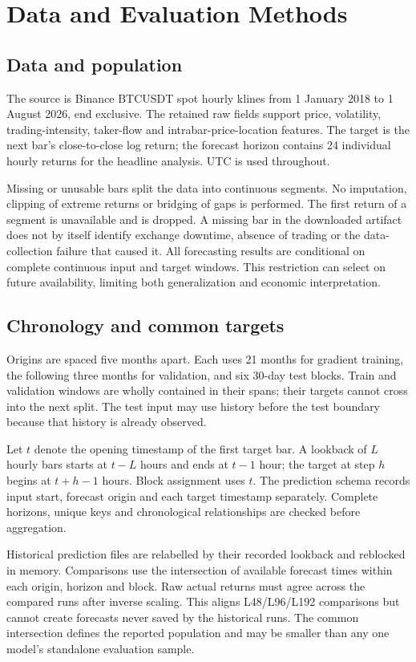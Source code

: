 \documentclass[onecolumn,journal,a4paper,11pt]{IEEEtran}
\begin{document}
\section{Data and Evaluation Methods}
\subsection{Data and population}
The source is Binance BTCUSDT spot hourly klines from 1 January 2018 to
1 August 2026, end exclusive. The retained raw fields support price,
volatility, trading-intensity, taker-flow and intrabar-price-location features.
The target is the next bar's close-to-close log return; the forecast horizon
contains 24 individual hourly returns for the headline analysis. UTC is used
throughout.

Missing or unusable bars split the data into continuous segments. No
imputation, clipping of extreme returns or bridging of gaps is performed.
The first return of a segment is unavailable and is dropped. A missing bar
in the downloaded artifact does not by itself identify exchange downtime,
absence of trading or the data-collection failure that caused it. All
forecasting results are conditional on complete continuous input and target
windows. This restriction can select on future availability, limiting both
generalization and economic interpretation.



\subsection{Chronology and common targets}
Origins are spaced five months apart. Each uses 21 months for gradient
training, the following three months for validation, and six 30-day test
blocks. Train and validation windows are wholly contained in their spans;
their targets cannot cross into the next split. The test input may use
history before the test boundary because that history is already observed.

Let $t$ denote the opening timestamp of the first target bar. A lookback of
$L$ hourly bars starts at $t-L$ hours and ends at $t-1$ hour; the target at
step $h$ begins at $t+h-1$ hours. Block assignment uses $t$. The prediction
schema records input start, forecast origin and each target timestamp
separately. Complete horizons, unique keys and chronological relationships
are checked before aggregation.

Historical prediction files are relabelled by their recorded lookback and
reblocked in memory. Comparisons use the intersection of available forecast
times within each origin, horizon and block. Raw actual returns must agree
across the compared runs after inverse scaling. This aligns L48/L96/L192
comparisons but cannot create forecasts never saved by the historical runs.
The common intersection defines the reported population and may be smaller
than any one model's standalone evaluation sample.
\end{document}
